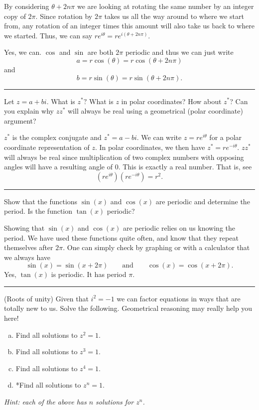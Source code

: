 \documentclass[12pt]{article} %
\begin{document}
\begin{solution}
By considering $\theta+2n\pi$ we are looking at rotating the same number by an integer copy of $2\pi$. Since rotation by $2\pi$ takes us all the way around to where we start from, any rotation of an integer times this amount will also take us back to where we started. Thus, we can say $re^{i\theta}=re^{i(\theta+2n\pi)}$. 

Yes, we can. $\cos$ and $\sin$ are both $2\pi$ periodic and thus we can just write
\[
a=r\cos(\theta)=r\cos(\theta+2n\pi)
\]
and
\[
b=r\sin(\theta)=r\sin(\theta+2n\pi).
\]
\end{solution}

\hrule

\begin{problem}
Let $z=a+bi$.  What is $z^*?$  What is $z$ in polar coordinates? How about $z^*$? Can you explain why $zz^*$ will always be real using a geometrical (polar coordinate) argument?
\end{problem}

\begin{solution}
$z^*$ is the complex conjugate and $z^*=a-bi$.  We can write $z=re^{i\theta}$ for a polar coordinate representation of $z$.  In polar coordinates, we then have $z^*=re^{-i\theta}$. $zz^*$ will always be real since multiplication of two complex numbers with opposing angles will have a resulting angle of $0$. This is exactly a real number. That is, see
\[
\left( re^{i\theta} \right) \left(re^{-i\theta}\right) = r^2.
\]
\end{solution}

\hrule

\begin{problem}
Show that the functions $\sin(x)$ and $\cos(x)$ are periodic and determine the period.  Is the function $\tan(x)$ periodic?
\end{problem}

\begin{solution}
Showing that $\sin(x)$ and $\cos(x)$ are periodic relies on us knowing the period.  We have used these functions quite often, and know that they repeat themselves after $2\pi$. One can simply check by graphing or with a calculator that we always have
\[
\sin(x)=\sin(x+2\pi) \qquad \textrm{and} \qquad \cos(x)=\cos(x+2\pi).
\]
Yes, $\tan(x)$ is periodic.  It has period $\pi$.
\end{solution}


\hrule 
\begin{problem}
(Roots of unity) Given that $i^2=-1$ we can factor equations in ways that are totally new to us.  Solve the following. Geometrical reasoning may really help you here!
\begin{enumerate}[(a)]
    \item Find all solutions to $z^2=1$.
    \item Find all solutions to $z^3=1$.
    \item Find all solutions to $z^4=1$.
    \item *Find all solutions to $z^n=1$.
\end{enumerate}
\emph{Hint: each of the above has $n$ solutions for $z^n$.}
\end{problem}
\end{document}
